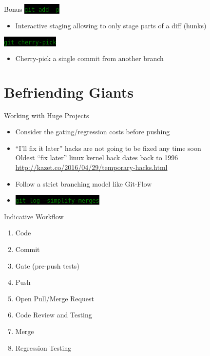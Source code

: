 \documentclass[
14pt,
aspectratio=169,
usenames,
dvipsnames,
x11names]{beamer}
\newcommand{\code}[1]{{\small\setlength{\fboxsep}{2pt}\colorbox{black}{\textcolor{green}{\texttt{#1}}}}}
\begin{document}
\begin{frame}{Bonus}
  \code{git add -p}
  \begin{itemize}
  \item Interactive staging allowing to only stage parts of a diff
    (hunks)
  \end{itemize}

  \vfill
  \pause

  \code{git cherry-pick}
  \begin{itemize}
  \item Cherry-pick a single commit from another branch
  \end{itemize}
\end{frame}

\section{Befriending Giants}

\begin{frame}{Working with Huge Projects}
  \begin{itemize}[<+->] \setlength{\itemsep}{\fill}
  \item Consider the \alert{gating/regression costs} before pushing
  \item ``I'll fix it later'' hacks are not going to be fixed any time soon\\[1ex]
    Oldest \alert{``fix later''} linux kernel hack dates back to \alert{1996} \url{http://kazet.co/2016/04/29/temporary-hacks.html}
  \item Follow a strict branching model like \alert{Git-Flow}
  \item \code{git log --simplify-merges}
  \end{itemize}
\end{frame}

\begin{frame}{Indicative Workflow}
  \begin{multicols}{2}
    \begin{enumerate}[<+->] \setlength{\itemsep}{\fill}
    \item Code
    \item Commit
    \item Gate (pre-push tests)
    \item Push
    \item Open Pull/Merge Request
    \item Code Review and Testing
    \item Merge
    \item Regression Testing
    \end{enumerate}
  \end{multicols}
\end{frame}
\end{document}

